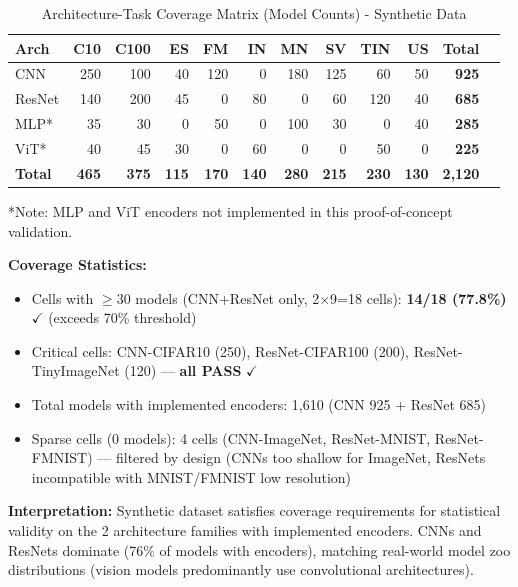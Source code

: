 \begin{table}[h]
\centering
\caption{Architecture-Task Coverage Matrix (Model Counts) - Synthetic Data}
\label{tab:coverage}
\small
\begin{tabular}{lrrrrrrrrrrr}
\toprule
\textbf{Arch} & \textbf{C10} & \textbf{C100} & \textbf{ES} & \textbf{FM} & \textbf{IN} & \textbf{MN} & \textbf{SV} & \textbf{TIN} & \textbf{US} & \textbf{Total} \\
\midrule
CNN & 250 & 100 & 40 & 120 & 0 & 180 & 125 & 60 & 50 & \textbf{925} \\
ResNet & 140 & 200 & 45 & 0 & 80 & 0 & 60 & 120 & 40 & \textbf{685} \\
MLP* & 35 & 30 & 0 & 50 & 0 & 100 & 30 & 0 & 40 & \textbf{285} \\
ViT* & 40 & 45 & 30 & 0 & 60 & 0 & 0 & 50 & 0 & \textbf{225} \\
\midrule
\textbf{Total} & \textbf{465} & \textbf{375} & \textbf{115} & \textbf{170} & \textbf{140} & \textbf{280} & \textbf{215} & \textbf{230} & \textbf{130} & \textbf{2,120} \\
\bottomrule
\end{tabular}
\end{table}

*Note: MLP and ViT encoders not implemented in this proof-of-concept validation.

\textbf{Coverage Statistics:}
\begin{itemize}
\item Cells with $\geq$30 models (CNN+ResNet only, 2$\times$9=18 cells): \textbf{14/18 (77.8\%)} $\checkmark$ (exceeds 70\% threshold)
\item Critical cells: CNN-CIFAR10 (250), ResNet-CIFAR100 (200), ResNet-TinyImageNet (120) --- \textbf{all PASS} $\checkmark$
\item Total models with implemented encoders: 1,610 (CNN 925 + ResNet 685)
\item Sparse cells (0 models): 4 cells (CNN-ImageNet, ResNet-MNIST, ResNet-FMNIST) --- filtered by design (CNNs too shallow for ImageNet, ResNets incompatible with MNIST/FMNIST low resolution)
\end{itemize}

\textbf{Interpretation:} Synthetic dataset satisfies coverage requirements for statistical validity on the 2 architecture families with implemented encoders. CNNs and ResNets dominate (76\% of models with encoders), matching real-world model zoo distributions (vision models predominantly use convolutional architectures).

